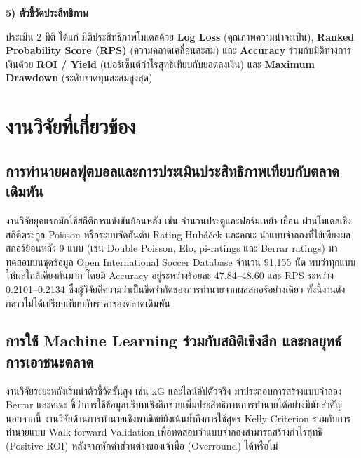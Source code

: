 \par\noindent\textbf{5) ตัวชี้วัดประสิทธิภาพ}\par\nopagebreak[4]
ประเมิน 2 มิติ ได้แก่ มิติประสิทธิภาพโมเดลด้วย \textbf{Log Loss} (คุณภาพความน่าจะเป็น), \textbf{Ranked Probability Score (RPS)} (ความคลาดเคลื่อนสะสม) และ \textbf{Accuracy} ร่วมกับมิติทางการเงินด้วย \textbf{ROI / Yield} (เปอร์เซ็นต์กำไรสุทธิเทียบกับยอดลงเงิน) และ \textbf{Maximum Drawdown} (ระดับขาดทุนสะสมสูงสุด)

\section{งานวิจัยที่เกี่ยวข้อง}

\subsection{การทำนายผลฟุตบอลและการประเมินประสิทธิภาพเทียบกับตลาดเดิมพัน}

งานวิจัยยุคแรกมักใช้สถิติการแข่งขันย้อนหลัง เช่น จำนวนประตูและฟอร์มเหย้า-เยือน ผ่านโมเดลเชิงสถิติตระกูล Poisson \cite{dixon1997modelling} หรือระบบจัดอันดับ Rating \cite{hvattum2010using, constantinou2013determining} Hubáček และคณะ \cite{hubacek2021forty} นำแบบจำลองที่ใช้เพียงผลสกอร์ย้อนหลัง 9 แบบ (เช่น Double Poisson, Elo, pi-ratings และ Berrar ratings) มาทดสอบบนชุดข้อมูล Open International Soccer Database \cite{dubitzky2019open} จำนวน 91,155 นัด พบว่าทุกแบบให้ผลใกล้เคียงกันมาก โดยมี Accuracy อยู่ระหว่างร้อยละ 47.84--48.60 และ RPS ระหว่าง 0.2101--0.2134 ซึ่งผู้วิจัยตีความว่าเป็นขีดจำกัดของการทำนายจากผลสกอร์อย่างเดียว ทั้งนี้งานดังกล่าวไม่ได้เปรียบเทียบกับราคาของตลาดเดิมพัน

\subsection{การใช้ Machine Learning ร่วมกับสถิติเชิงลึก และกลยุทธ์การเอาชนะตลาด}

งานวิจัยระยะหลังเริ่มนำตัวชี้วัดขั้นสูง เช่น xG และไลน์อัปตัวจริง มาประกอบการสร้างแบบจำลอง Berrar และคณะ \cite{berrar2019incorporating} ชี้ว่าการใช้ข้อมูลบริบทเชิงลึกช่วยเพิ่มประสิทธิภาพการทำนายได้อย่างมีนัยสำคัญ นอกจากนี้ งานวิจัยด้านการทำนายเชิงพาณิชย์ยังเน้นย้ำถึงการใช้สูตร Kelly Criterion ร่วมกับการทำนายแบบ Walk-forward Validation เพื่อทดสอบว่าแบบจำลองสามารถสร้างกำไรสุทธิ (Positive ROI) หลังจากหักค่าส่วนต่างของเจ้ามือ (Overround) ได้หรือไม่

